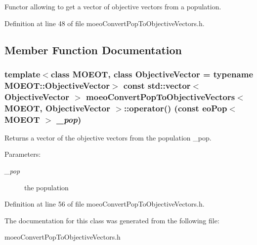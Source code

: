 Functor allowing to get a vector of objective vectors from a population. 



Definition at line 48 of file moeo\-Convert\-Pop\-To\-Objective\-Vectors.h.

\subsection{Member Function Documentation}
\subsubsection{\setlength{\rightskip}{0pt plus 5cm}template$<$class MOEOT, class Objective\-Vector = typename MOEOT::Objective\-Vector$>$ const std::vector$<$ \bf{Objective\-Vector} $>$ \bf{moeo\-Convert\-Pop\-To\-Objective\-Vectors}$<$ MOEOT, \bf{Objective\-Vector} $>$::operator() (const \bf{eo\-Pop}$<$ MOEOT $>$ {\em \_\-pop})\hspace{0.3cm}{\tt  [inline]}}\label{classmoeoConvertPopToObjectiveVectors_8fada75aa151a6eaa310c5064f783c86}


Returns a vector of the objective vectors from the population \_\-pop. 

\begin{Desc}
\item[Parameters:]
\begin{description}
\item[{\em \_\-pop}]the population \end{description}
\end{Desc}


Definition at line 56 of file moeo\-Convert\-Pop\-To\-Objective\-Vectors.h.

The documentation for this class was generated from the following file:\begin{CompactItemize}
\item 
moeo\-Convert\-Pop\-To\-Objective\-Vectors.h\end{CompactItemize}
